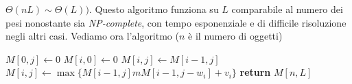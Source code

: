 \documentclass[a4paper,12pt, oneside]{book}
\begin{document}
$\Theta(nL)\sim \Theta(L))$. Questo algoritmo funziona su $L$
comparabile al numero dei pesi nonostante sia
\textit{NP-complete}, con tempo esponenziale e di difficile
risoluzione negli altri casi. Vediamo ora l'algoritmo ($n$ è il numero
di oggetti)
\begin{shaded}
  \begin{algorithmic}
    \State $M[0,j]\gets 0$
    \EndFor
    \State $M[i,0]\gets 0$
    \EndFor
    \State $M[i,j]\gets M[i-1,j]$
    \Else
    \State $M[i,j]\gets \max\{M[i-1,j]mM[i-1,j-w_i]+v_i\}$
    \EndIf
    \EndFor
    \EndFor
    \State \textbf{return} $M[n,L]$
    \EndFunction
  \end{algorithmic}
\end{shaded}
\end{document}
